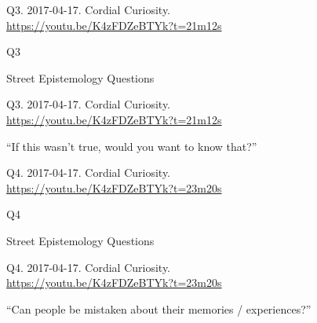 \documentclass[
    src/templates/5x2-on-a4paper,
    frame
]{flashcards}
\newcommand{\myheader}{}
\newcommand{\myfooter}{
    \begin{flushright}
        \small\sc
        Street Epistemology Questions \par
    \end{flushright}
}
\begin{document}
        \renewcommand{\myheader}{
            \normalfont %
            \begin{tiny}
                Q3.
                2017-04-17.
                Cordial Curiosity.
                    \\
                    \url{ https://youtu.be/K4zFDZeBTYk?t=21m12s }
                \par
            \end{tiny}
        }
        \begin{flashcard}{
            \myheader
            \vspace{\fill}
            \begin{center}
                \large
                    Q3
            \end{center}
            \vspace{\fill}
            \myfooter
            \vspace{-1.4ex}
        }
            \myheader
            \vspace{\fill}
            \begin{center}
                \large
\enquote{If this wasn't true, would you want to know that?}            \end{center}
            \vspace{\fill}
        \end{flashcard}
        \renewcommand{\myheader}{
            \normalfont %
            \begin{tiny}
                Q4.
                2017-04-17.
                Cordial Curiosity.
                    \\
                    \url{ https://youtu.be/K4zFDZeBTYk?t=23m20s }
                \par
            \end{tiny}
        }
        \begin{flashcard}{
            \myheader
            \vspace{\fill}
            \begin{center}
                \large
                    Q4
            \end{center}
            \vspace{\fill}
            \myfooter
            \vspace{-1.4ex}
        }
            \myheader
            \vspace{\fill}
            \begin{center}
                \large
\enquote{Can people be mistaken about their memories / experiences?}            \end{center}
            \vspace{\fill}
        \end{flashcard}
\end{document}
